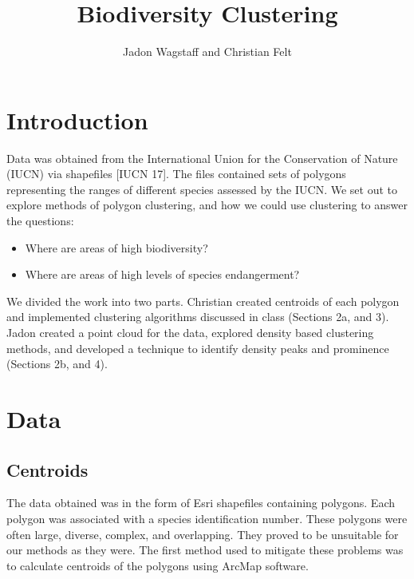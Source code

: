 \documentclass[11pt, fullpage,letterpaper]{article}
\title{Biodiversity Clustering}
\author{Jadon Wagstaff and Christian Felt}
\begin{document}
	\maketitle
	
	\section{Introduction}
		Data was obtained from the International Union for the Conservation of Nature (IUCN) via shapefiles [IUCN 17]. The files contained sets of polygons representing the ranges of different species assessed by the IUCN. We set out to explore methods of polygon clustering, and how we could use clustering to answer the questions:
		\begin{itemize}
			\item Where are areas of high biodiversity?
			\item Where are areas of high levels of species endangerment?
		\end{itemize} 
		We divided the work into two parts. Christian created centroids of each polygon and implemented clustering algorithms discussed in class (Sections 2a, and 3). Jadon created a point cloud for the data, explored density based clustering methods, and developed a technique to identify density peaks and prominence (Sections 2b, and 4).
	
	\section{Data}
	\subsection{Centroids}
		The data obtained was in the form of Esri shapefiles containing polygons. Each polygon was associated with a species identification number. These polygons were often large, diverse, complex, and overlapping. They proved to be unsuitable for our methods as they were. The first method used to mitigate these problems was to calculate centroids of the polygons using ArcMap software.
		
\end{document}
